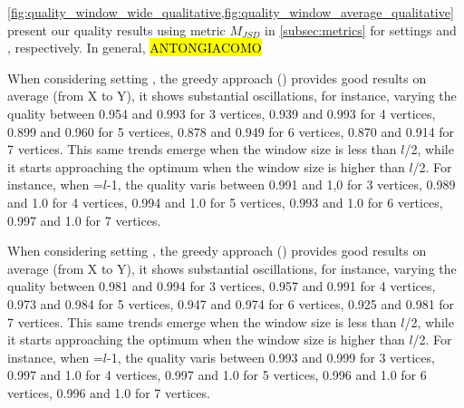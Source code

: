 \cref{fig:quality_window_wide_qualitative,fig:quality_window_average_qualitative} present our quality results using metric $M_{JSD}$ in \cref{subsec:metrics} for settings \wide and \average, respectively.
In general, \hl{ANTONGIACOMO}

When considering setting \wide, the greedy approach () provides good results on average (from X to Y), it shows substantial oscillations, for instance, varying the quality between 0.954 and 0.993 for 3 vertices, 0.939 and 0.993 for 4 vertices, 0.899 and 0.960 for 5 vertices, 0.878 and 0.949 for 6 vertices, 0.870 and 0.914 for 7 vertices. This same trends emerge when the window size is less than $l$/2, while it starts approaching the optimum when the window size is higher than $l$/2. For instance, when \windowsize=$l$-1, the quality varis between  0.991 and  1,0 for 3 vertices, 0.989 and 1.0 for 4 vertices, 0.994 and 1.0 for 5 vertices, 0.993 and 1.0 for 6 vertices, 0.997 and 1.0 for 7 vertices.


When considering setting \average, the greedy approach () provides good results on average (from X to Y), it shows substantial oscillations, for instance, varying the quality between 0.981 and 0.994 for 3 vertices, 0.957 and 0.991 for 4 vertices, 0.973 and 0.984 for 5 vertices, 0.947 and 0.974 for 6 vertices, 0.925 and 0.981 for 7 vertices. This same trends emerge when the window size is less than $l$/2, while it starts approaching the optimum when the window size is higher than $l$/2. For instance, when \windowsize=$l$-1, the quality varis between  0.993 and  0.999 for 3 vertices, 0.997 and 1.0 for 4 vertices, 0.997 and 1.0 for 5 vertices, 0.996 and 1.0 for 6 vertices, 0.996 and 1.0 for 7 vertices.


